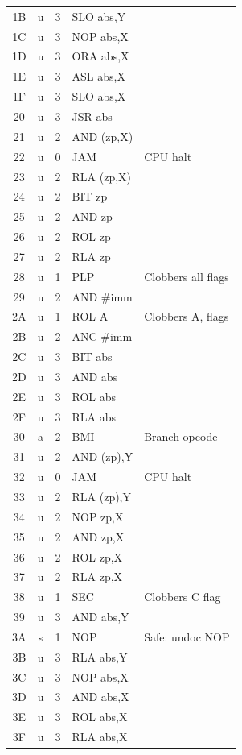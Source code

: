 \documentclass{article}
\begin{document}
{\begin{longtable}{@{}ccclp{4.8cm}@{}}
1B & u  & 3 & SLO abs,Y & \\
1C & u  & 3 & NOP abs,X & \\
1D & u  & 3 & ORA abs,X & \\
1E & u  & 3 & ASL abs,X & \\
1F & u  & 3 & SLO abs,X & \\
20 & u  & 3 & JSR abs & \\
21 & u  & 2 & AND (zp,X) & \\
22 & u  & 0 & JAM & CPU halt \\
23 & u  & 2 & RLA (zp,X) & \\
24 & u  & 2 & BIT zp & \\
25 & u  & 2 & AND zp & \\
26 & u  & 2 & ROL zp & \\
27 & u  & 2 & RLA zp & \\
28 & u  & 1 & PLP & Clobbers all flags \\
29 & u  & 2 & AND \#imm & \\
2A & u  & 1 & ROL A & Clobbers A, flags \\
2B & u  & 2 & ANC \#imm & \\
2C & u  & 3 & BIT abs & \\
2D & u  & 3 & AND abs & \\
2E & u  & 3 & ROL abs & \\
2F & u  & 3 & RLA abs & \\
30 & a  & 2 & BMI & Branch opcode \\
31 & u  & 2 & AND (zp),Y & \\
32 & u  & 0 & JAM & CPU halt \\
33 & u  & 2 & RLA (zp),Y & \\
34 & u  & 2 & NOP zp,X & \\
35 & u  & 2 & AND zp,X & \\
36 & u  & 2 & ROL zp,X & \\
37 & u  & 2 & RLA zp,X & \\
38 & u  & 1 & SEC & Clobbers C flag \\
39 & u  & 3 & AND abs,Y & \\
3A & s  & 1 & NOP & Safe: undoc NOP \\
3B & u  & 3 & RLA abs,Y & \\
3C & u  & 3 & NOP abs,X & \\
3D & u  & 3 & AND abs,X & \\
3E & u  & 3 & ROL abs,X & \\
3F & u  & 3 & RLA abs,X & \\

\end{longtable}}
\end{document}
